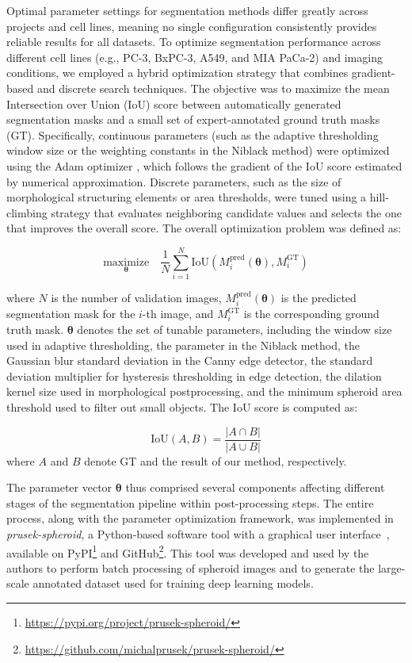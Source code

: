 \documentclass[preprint,12pt]{elsarticle}
\begin{document}
Optimal parameter settings for segmentation methods differ greatly across projects and cell lines, meaning no single configuration consistently provides reliable results for all datasets. To optimize segmentation performance across different cell lines (e.g., PC-3, BxPC-3, A549, and MIA PaCa-2) and imaging conditions, we employed a hybrid optimization strategy that combines gradient-based and discrete search techniques. The objective was to maximize the mean Intersection over Union (IoU) score between automatically generated segmentation masks and a small set of expert-annotated ground truth masks (GT). Specifically, continuous parameters (such as the adaptive thresholding window size or the weighting constants in the Niblack method) were optimized using the Adam optimizer \cite{2014adam}, which follows the gradient of the IoU score estimated by numerical approximation. Discrete parameters, such as the size of morphological structuring elements or area thresholds, were tuned using a hill-climbing strategy that evaluates neighboring candidate values and selects the one that improves the overall score. The overall optimization problem was defined as:

\begin{equation}
\underset{\boldsymbol{\theta}}{\text{maximize}} \quad \frac{1}{N} \sum_{i=1}^{N} \text{IoU}(M_i^{\text{pred}}(\boldsymbol{\theta}), M_i^{\text{GT}})
\end{equation}

where $N$ is the number of validation images, $M_i^{\text{pred}}(\boldsymbol{\theta})$ is the predicted segmentation mask for the $i$-th image, and $M_i^{\text{GT}}$ is the corresponding ground truth mask. $\boldsymbol{\theta}$ denotes the set of tunable parameters, including the window size used in adaptive thresholding, the parameter in the Niblack method, the Gaussian blur standard deviation in the Canny edge detector, the standard deviation multiplier for hysteresis thresholding in edge detection, the dilation kernel size used in morphological postprocessing, and the minimum spheroid area threshold used to filter out small objects.
The $\text{IoU}$ score is computed as:

\begin{equation}
\text{IoU}(A, B) = \frac{|A \cap B|}{|A \cup B|}
\end{equation}
%
where $A$ and $B$ denote GT and the result of our method, respectively.

The parameter vector $\boldsymbol{\theta}$ thus comprised several components affecting different stages of the segmentation pipeline within post-processing steps. The entire process, along with the parameter optimization framework, was implemented in \textit{prusek-spheroid}, a Python-based software tool with a graphical user interface~\cite{prusek2024spheroid}, available on PyPI\footnote{\url{https://pypi.org/project/prusek-spheroid/}} and GitHub\footnote{\url{https://github.com/michalprusek/prusek-spheroid/}}. This tool was developed and used by the authors to perform batch processing of spheroid images and to generate the large-scale annotated dataset used for training deep learning models.
\end{document}
